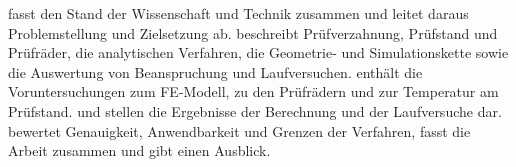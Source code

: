  fasst den Stand der Wissenschaft und Technik zusammen und leitet daraus Problemstellung und Zielsetzung ab.  beschreibt Prüfverzahnung, Prüfstand und Prüfräder, die analytischen Verfahren, die Geometrie- und Simulationskette sowie die Auswertung von Beanspruchung und Laufversuchen.  enthält die Voruntersuchungen zum FE-Modell, zu den Prüfrädern und zur Temperatur am Prüfstand.  und  stellen die Ergebnisse der Berechnung und der Laufversuche dar.  bewertet Genauigkeit, Anwendbarkeit und Grenzen der Verfahren,  fasst die Arbeit zusammen und gibt einen Ausblick.

